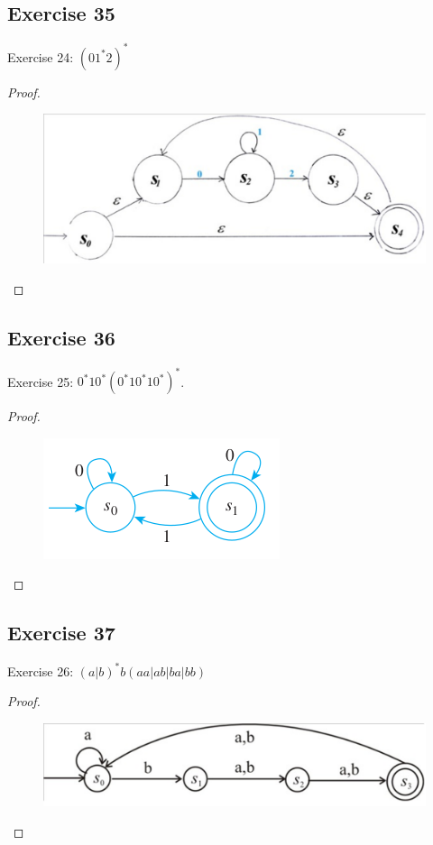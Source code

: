 \documentclass[14pt]{extarticle}
\begin{document}
\subsection{Exercise 35}
Exercise 24: \((01^*2)^*\)
\begin{proof}
\begin{figure}[ht!]
\centering
\includegraphics[scale=0.3]{../images/12.2.35.png}
\end{figure}
\end{proof}

\subsection{Exercise 36}
Exercise 25: \(0^*10^*(0^*10^*10^*)^*\).
\begin{proof}
\begin{figure}[ht!]
\centering
\includegraphics[scale=0.5]{../images/12.2.36.png}
\end{figure}
\end{proof}

\subsection{Exercise 37}
Exercise 26: \((a|b)^*b(aa|ab|ba|bb)\)
\begin{proof}
\begin{figure}[ht!]
\centering
\includegraphics[scale=0.3]{../images/12.2.37.png}
\end{figure}
\end{proof}
\end{document}
